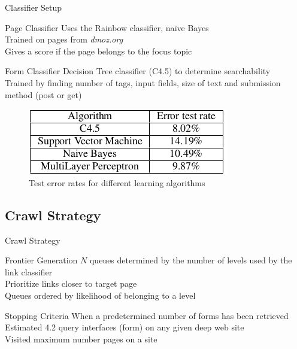 \documentclass{beamer}
\begin{document}
\begin{frame}{Classifier Setup}
\begin{block}{Page Classifier}
Uses the Rainbow classifier, na{\"i}ve Bayes \\
Trained on pages from \emph{dmoz.org} \\
Gives a score if the page belongs to the focus topic \\
\end{block}
\begin{block}{Form Classifier}
Decision Tree classifier (C4.5) to determine searchability \\
Trained by finding number of tags, input fields, size of text and submission method (post or get) 
\end{block}
\begin{figure}
			\includegraphics[scale=0.4]{cer.png}
			\caption{\footnotesize{Test error rates for different learning algorithms}}
		\end{figure}
\end{frame}
\subsection{Crawl Strategy}
\begin{frame}{Crawl Strategy}
\begin{block}{Frontier Generation}
$N$ queues determined by the number of levels used by the link classifier \\
Prioritize links closer to target page \\
Queues ordered by likelihood of belonging to a level \\
\end{block}
\begin{block}{Stopping Criteria}
When a predetermined number of forms  has been retrieved \\
Estimated 4.2 query interfaces (form) on any given deep web site \\
Visited maximum number pages on a site \\ 
\end{block}
\end{frame}
\end{document}
